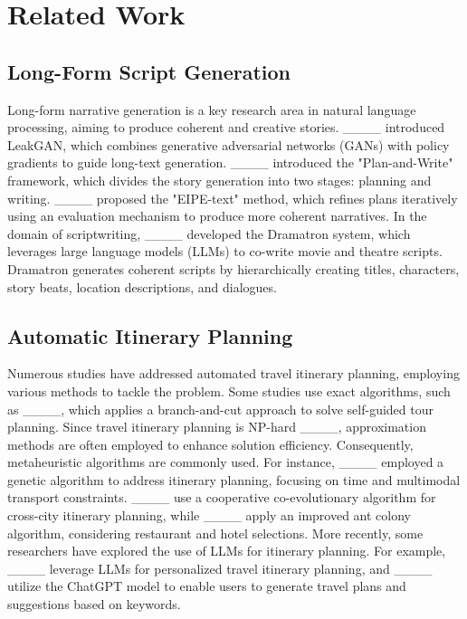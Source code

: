 \section{Related Work}
\subsection{Long-Form Script Generation}

Long-form narrative generation is a key research area in natural language processing, aiming to produce coherent and creative stories. ____ introduced LeakGAN, which combines generative adversarial networks (GANs) with policy gradients to guide long-text generation. ____ introduced the "Plan-and-Write" framework, which divides the story generation into two stages: planning and writing. ____ proposed the "EIPE-text" method, which refines plans iteratively using an evaluation mechanism to produce more coherent narratives.  In the domain of scriptwriting, ____ developed the Dramatron system, which leverages large language models (LLMs) to co-write movie and theatre scripts. Dramatron generates coherent scripts by hierarchically creating titles, characters, story beats, location descriptions, and dialogues.

\subsection{Automatic Itinerary Planning}

Numerous studies have addressed automated travel itinerary planning, employing various methods to tackle the problem. Some studies use exact algorithms, such as ____, which applies a branch-and-cut approach to solve self-guided tour planning. Since travel itinerary planning is NP-hard ____, approximation methods are often employed to enhance solution efficiency. Consequently, metaheuristic algorithms are commonly used. For instance, ____ employed a genetic algorithm to address itinerary planning, focusing on time and multimodal transport constraints. ____ use a cooperative co-evolutionary algorithm for cross-city itinerary planning, while ____ apply an improved ant colony algorithm, considering restaurant and hotel selections. More recently, some researchers have explored the use of LLMs for itinerary planning. For example, ____ leverage LLMs for personalized travel itinerary planning, and ____ utilize the ChatGPT model to enable users to generate travel plans and suggestions based on keywords.